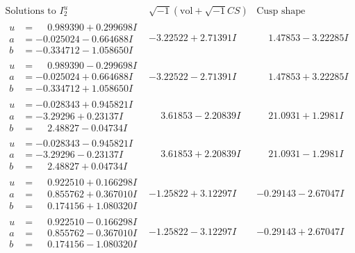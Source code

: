 \documentclass[1p]{elsarticle_modified}
\theoremstyle{definition}
\newcommand{\I}{\sqrt{-1}}
\begin{document}
$$\begin{array}{c|c|c}  
\text{Solutions to }I^u_{2}& \I (\text{vol} + \sqrt{-1}CS) & \text{Cusp shape}\\
 \hline 
\begin{aligned}
u &= \phantom{-}0.989390 + 0.299698 I \\
a &= -0.025024 - 0.664688 I \\
b &= -0.334712 - 1.058650 I\end{aligned}
 & -3.22522 + 2.71391 I & \phantom{-}1.47853 - 3.22285 I \\ \hline\begin{aligned}
u &= \phantom{-}0.989390 - 0.299698 I \\
a &= -0.025024 + 0.664688 I \\
b &= -0.334712 + 1.058650 I\end{aligned}
 & -3.22522 - 2.71391 I & \phantom{-}1.47853 + 3.22285 I \\ \hline\begin{aligned}
u &= -0.028343 + 0.945821 I \\
a &= -3.29296 + 0.23137 I \\
b &= \phantom{-}2.48827 - 0.04734 I\end{aligned}
 & \phantom{-}3.61853 - 2.20839 I & \phantom{-}21.0931 + 1.2981 I \\ \hline\begin{aligned}
u &= -0.028343 - 0.945821 I \\
a &= -3.29296 - 0.23137 I \\
b &= \phantom{-}2.48827 + 0.04734 I\end{aligned}
 & \phantom{-}3.61853 + 2.20839 I & \phantom{-}21.0931 - 1.2981 I \\ \hline\begin{aligned}
u &= \phantom{-}0.922510 + 0.166298 I \\
a &= \phantom{-}0.855762 + 0.367010 I \\
b &= \phantom{-}0.174156 + 1.080320 I\end{aligned}
 & -1.25822 + 3.12297 I & -0.29143 - 2.67047 I \\ \hline\begin{aligned}
u &= \phantom{-}0.922510 - 0.166298 I \\
a &= \phantom{-}0.855762 - 0.367010 I \\
b &= \phantom{-}0.174156 - 1.080320 I\end{aligned}
 & -1.25822 - 3.12297 I & -0.29143 + 2.67047 I \\ \hline\begin{aligned}

\end{aligned}
\end{array}$$
\end{document}
